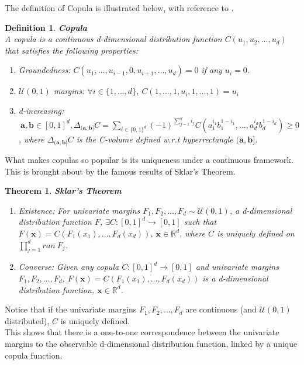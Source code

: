 \documentclass[12pt]{report}
\newtheorem{theorem}{Theorem}[subsection]
\newtheorem{definition}{Definition}[subsection]
\newcommand{\1}{\mathbf{1}}
\begin{document}
\begin{flushleft}
\vspace{0.5cm}
The definition of Copula is illustrated below, with reference to \cite{HofertBook}.\\

\begin{definition}\label{CopProperties}
\textbf{Copula} \\
A copula is a continuous d-dimensional distribution function $C(u_{1}, u_{2}, \dots, u_{d}) $ that satisfies the following properties: \\
\begin{enumerate}
    \item Groundedness: \: $C(u_{1}, \dots, u_{i-1}, 0, u_{i+1}, \dots, u_{d}) = 0$ if any $u_{i} = 0$.\\
    \item $\mathcal{U}(0,1)$ margins: \: $\forall i \in \{1, \dots,d\}, \: C(1, \dots, 1, u_{i}, 1, \dots, 1) = u_{i}$\\
    \item d-increasing: $\: \textbf{a}, \textbf{b} \in [0,1]^{d}, \Delta_{(\textbf{a},\textbf{b}]}C = \sum\limits_{i \in \{0,1\}^{d}} (-1)^{\sum_{j=1}^{d}i_{j}}C(a_{1}^{i_{1}}b_{1}^{1-i_{1}}, \dots, a_{d}^{i_{d}}b_{d}^{1-i_{d}})  \ge 0 $, \: where $\Delta_{(\textbf{a},\textbf{b}]}C$ is the C-volume defined w.r.t hyperrectangle $(\textbf{a},\textbf{b}]$.
\end{enumerate}
\end{definition}


What makes copulas so popular is its uniqueness under a continuous framework. This is brought about by the famous results of Sklar's Theorem.

\begin{theorem}\label{SklarTheorem}
\textit{\normalfont \parencite{SklarTheorem}}
\textbf{Sklar's Theorem}
\vspace{-0.2cm}
\begin{enumerate}
    \item Existence: For univariate margins $F_{1}, F_{2}, \dots, F_{d} \sim \mathcal{U}(0,1)$, a d-dimensional distribution function $F$, $\exists C: [0,1]^{d} \rightarrow [0,1]$ such that $F(\textbf{x}) = C(F_{1}(x_{1}), \dots, F_{d}(x_{d}))$, $\textbf{x} \in \mathbb{R}^{d}$, where $C$ is uniquely defined on $\prod_{j=1}^{d} ran \: F_{j}$.
    \item Converse: Given any copula $C: [0,1]^{d} \rightarrow [0,1]$ and univariate margins $F_{1}, F_{2}, \dots, F_{d}$, $F(\textbf{x}) = C(F_{1}(x_{1}), \dots, F_{d}(x_{d}))$ is a d-dimensional distribution function, $\textbf{x} \in \mathbb{R}^{d}$.
\end{enumerate}
\end{theorem}
Notice that if the univariate margins $F_{1}, F_{2}, \dots, F_{d}$ are continuous (and $\mathcal{U}(0,1)$ distributed), $C$ is uniquely defined. \\
\vspace{0.5cm}
This shows that there is a one-to-one correspondence between the univariate margins to the observable d-dimensional distribution function, linked by a unique copula function. \\
\vspace{0.5cm}


\end{flushleft}
\end{document}
